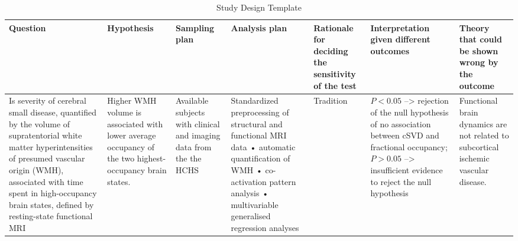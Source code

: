\renewcommand\cellset{\renewcommand\arraystretch{0.5}%
    \setlength\extrarowheight{0pt}}
\begin{table}[bt]
    \scriptsize
    \begin{fullwidth}
        \begin{threeparttable}
            \begin{spacing}{0.8}\centering
                \begin{tabularx}{1.3\textwidth}{p{.2\linewidth} p{.1\linewidth} p{.09\linewidth} p{.15\linewidth} p{.09\linewidth} p{.14\linewidth} p{.08\linewidth}}
                    \toprule
                    Question   & Hypothesis     & Sampling plan     & Analysis plan   & Rationale for deciding the sensitivity of the test & Interpretation given different outcomes & Theory that could be shown wrong by the outcome \\
                    \midrule
                    Is severity of cerebral small disease, quantified by the volume of supratentorial white matter hyperintensities of presumed vascular origin (WMH), associated with time spent in high-occupancy brain states, defined by resting-state functional MRI & 
                    Higher WMH volume is associated with lower average occupancy of the two highest-occupancy brain states. & 
                    Available subjects with clinical and imaging data from the the HCHS \citep{Jagodzinski2020-lx} & 
                    Standardized preprocessing of structural and functional MRI data • automatic quantification of WMH • co-activation pattern analysis • multivariable generalised regression analyses &
                    Tradition &
                    \makecell[tp{\linewidth}]{$P<0.05$ --> rejection of the null hypothesis of no association between cSVD and fractional occupancy;\\ $P>0.05$ --> insufficient evidence to reject the null hypothesis}    &
                    Functional brain dynamics are not related to subcortical ischemic vascular disease.    \\
                    \bottomrule
                \end{tabularx}
            \end{spacing}
            \bigskip
            \caption{Study Design Template}
            \label{tab:SDT}
        \end{threeparttable}
    \end{fullwidth}
\end{table}